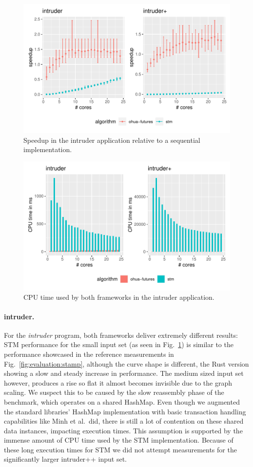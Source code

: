 \begin{figure}
    \centering
    \includegraphics[width=.66\textwidth,keepaspectratio]{gfx/results/intruder_comb}
    \caption{Speedup in the intruder application relative to a sequential implementation.}%
    \label{fig:evaluation:intruder}
\end{figure}

\begin{figure}
    \centering
    \includegraphics[width=.66\textwidth,keepaspectratio]{gfx/results/cpu_intruder_comb}
    \caption{CPU time used by both frameworks in the intruder application.}%
    \label{fig:evaluation:intruder-cpu}
\end{figure}

\paragraph{intruder.} For the \emph{intruder} program, both frameworks deliver extremely different results:
STM performance for the small input set (as seen in Fig.~\ref{fig:evaluation:intruder}) is similar to the performance showcased in the reference measurements in Fig.~\ref{fig:evaluation:stamp}, although the curve shape is different, the Rust version showing a slow and steady increase in performance.
The medium sized input set however, produces a rise so flat it almost becomes invisible due to the graph scaling.
We suspect this to be caused by the slow reassembly phase of the benchmark, which operates on a shared HashMap.
Even though we augmented the standard libraries' HashMap implementation with basic transaction handling capabilities like Minh et al.\ did, there is still a lot of contention on these shared data instances, impacting execution times.
This assumption is supported by the immense amount of CPU time used by the STM implementation.
Because of these long execution times for STM we did not attempt measurements for the significantly larger intruder++ input set.

